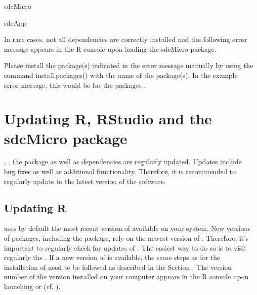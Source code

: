 \documentclass[letterpaper,10pt,english]{sphinxmanual}
\begin{document}
\def\sphinxLiteralBlockLabel{\label{\detokenize{installation:code02}}}
%
\begin{sphinxVerbatim}[commandchars=\\\{\},numbers=left,firstnumber=1,stepnumber=1]
sdcMicro

sdcApp
\end{sphinxVerbatim}

In rare cases, not all dependencies are correctly installed and the following error
message appears in the R console upon loading the sdcMicro package.

Please install the package(s) indicated in the error message manually by using the
command install.packages() with the name of the package(s). In the example error message,
this would be for the packages .


\section{Updating R, RStudio and the sdcMicro package}
\label{\detokenize{installation:updating-r-rstudio-and-the-sdcmicro-package}}
, , the  package as well as dependencies are regularly updated. Updates include
bug fixes as well as additional functionality. Therefore,
it is recommended to regularly update to the latest version of the software.


\subsection{Updating R}
\label{\detokenize{installation:updating-r}}
 uses by default the most recent version of  available on your system. New
versions of  packages, including the  package, rely on the newest version of . Therefore,
it’s important to regularly check for updates of . The easiest way to do so
is to visit regularly the .
If a new version of  is available, the same steps as for the installation of  need to be followed
as described in the Section {\hyperref[\detokenize{installation:installing-r-and-rstudio}]{}}. The version number of the
 version installed on your computer appears in the R console upon launching  or 
(cf. ).
\end{document}
